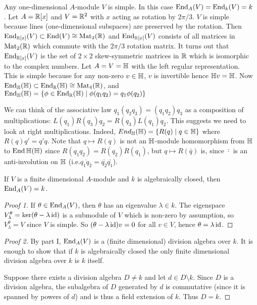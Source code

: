 \begin{exam}
	\begin{enum}
		\io Any one-dimensional $A$-module $V$ is simple.
		In this case $\operatorname{End}_A(V) = \operatorname{End}_k(V) = k$.
		\io Let $A=\mathbb{R}[x]$ and $V=\mathbb{R}^2$ with $x$ acting as rotation by $2\pi/3$.
		$V$ is simple because lines (one-dimensional subspaces) are preserved by the rotation.
		Then $\operatorname{End}_{\mathbb{R}[x]}(V) \subset \operatorname{End}(V) \cong \operatorname{Mat}_2(\mathbb{R})$ and $\operatorname{End}_{\mathbb{R}[x]}(V)$ consists of all matrices in $\operatorname{Mat}_2(\mathbb{R})$ which commute with the $2\pi/3$ rotation matrix.
		It turns out that $\operatorname{End}_{\mathbb{R}[x]}(V)$ is the set of $2 \times 2$ skew-symmetric matrices in $\mathbb{R}$ which is isomorphic to the complex numbers.
		\io Let $A=V=\mathbb{H}$ with the left regular representation.
		This is simple because for any non-zero $v \in \mathbb{H}$, $v$ is invertible hence $\mathbb{H} v = \mathbb{H}$.
		Now $\operatorname{End}_{\mathbb{H}}(\mathbb{H}) \subset \operatorname{End}_{\mathbb{R}}(\mathbb{H}) \cong \operatorname{Mat}_4(\mathbb{R})$, and $\operatorname{End}_{\mathbb{H}}(\mathbb{H}) = \{\phi \in \operatorname{End}_{\mathbb{R}}(\mathbb{H}) \mid \phi(q_1q_2) = q_1\phi(q_2)\}$
		
		We can think of the associative law $q_1(q_2q_3)=(q_1q_2)q_3$ as a composition of multiplications: $L(q_1)R(q_3)q_2=R(q_3)L(q_1)q_2$.
		This suggests we need to look at right multiplications.
		Indeed, $End_{\mathbb{H}}(\mathbb{H}) = \{R(q) \mid q \in \mathbb{H}\}$ where $R(q)q' = q'q$.
		Note that $q \mapsto R(q)$ is not an $\mathbb{H}$-module homomorphism from $\mathbb{H}$ to $\operatorname{End} \mathbb{H}(\mathbb{H})$ since $R(q_1q_2)=R(q_2)R(q_1)$, but $q \mapsto R(\bar{q})$ is, since $\bar{\cdot}$ is an anti-involution on $\mathbb{H}$ (i.e.\@ $\overline{q_1q_2}=\bar{q_2}\bar{q_1}$).
	\end{enum}
\end{exam}

\begin{thm}
	If $V$ is a finite dimensional $A$-module and $k$ is algebraically closed, then $\operatorname{End}_A(V)=k$.
\end{thm}

\begin{proof}[Proof 1]
	If $\theta \in \operatorname{End}_A(V)$, then $\theta$ has an eigenvalue $\lambda \in k$.
	The eigenspace $V_\lambda^\theta = \ker(\theta-\lambda\operatorname{id})$ is a submodule of $V$ which is non-zero by assumption, so $V_\lambda^\theta=V$ since $V$ is simple.
	So $(\theta-\lambda\operatorname{id})v=0$ for all $v \in V$, hence $\theta=\lambda\operatorname{id}$.
\end{proof}

\begin{proof}[Proof 2]
	By part I, $\operatorname{End}_A(V)$ is a (finite dimensional) division algebra over $k$.
	It is enough to show that if $k$ is algebraically closed the only finite dimensional division algebra over $k$ is $k$ itself.
	
	Suppose there exists a division algebra $D \neq k$ and let $d \in D \setminus k$.
	Since $D$ is a division algebra, the subalgebra of $D$ generated by $d$ is commutative (since it is spanned by powers of $d$) and is thus a field extension of $k$.
	Thus $D=k$.
\end{proof}

